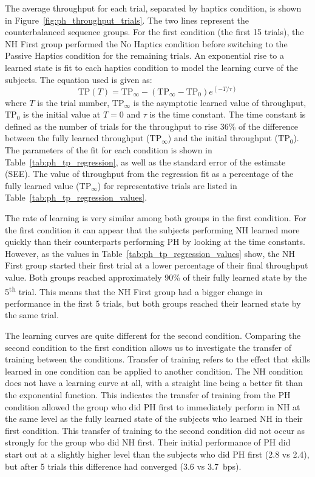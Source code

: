 The average throughput for each trial, separated by haptics condition, is shown in Figure~\ref{fig:ph_throughput_trials}.
The two lines represent the counterbalanced sequence groups.
For the first condition (the first 15 trials), the NH First group performed the No Haptics condition before switching to the Passive Haptics condition for the remaining trials.
An exponential rise to a learned state is fit to each haptics condition to model the learning curve of the subjects.
The equation used is given as:
\begin{equation}
    \mathrm{TP}(T) = \mathrm{TP}_{\infty} - (\mathrm{TP}_{\infty}-\mathrm{TP}_0)e^{\left( -T / \tau \right)}
    \label{eq:ph_learning}
\end{equation}
where $T$ is the trial number, $\mathrm{TP}_{\infty}$ is the asymptotic learned value of throughput, $\mathrm{TP}_0$ is the initial value at $T=0$ and $\tau$ is the time constant.
The time constant is defined as the number of trials for the throughput to rise 36\% of the difference between the fully learned throughput ($\mathrm{TP}_{\infty}$) and the initial throughput ($\mathrm{TP}_0$).
The parameters of the fit for each condition is shown in Table~\ref{tab:ph_tp_regression}, as well as the standard error of the estimate (SEE).
The value of throughput from the regression fit as a percentage of the fully learned value ($\mathrm{TP}_{\infty}$) for representative trials are listed in Table~\ref{tab:ph_tp_regression_values}.

The rate of learning is very similar among both groups in the first condition.
For the first condition it can appear that the subjects performing NH learned more quickly than their counterparts performing PH by looking at the time constants.
However, as the values in Table~\ref{tab:ph_tp_regression_values} show, the NH First group started their first trial at a lower percentage of their final throughput value.
Both groups reached approximately 90\% of their fully learned state by the 5\textsuperscript{th} trial.
This means that the NH First group had a bigger change in performance in the first 5 trials, but both groups reached their learned state by the same trial.

The learning curves are quite different for the second condition.
Comparing the second condition to the first condition allows us to investigate the transfer of training between the conditions.
Transfer of training refers to the effect that skills learned in one condition can be applied to another condition.
The NH condition does not have a learning curve at all, with a straight line being a better fit than the exponential function.
This indicates the transfer of training from the PH condition allowed the group who did PH first to immediately perform in NH at the same level as the fully learned state of the subjects who learned NH in their first condition.
This transfer of training to the second condition did not occur as strongly for the group who did NH first.
Their initial performance of PH did start out at a slightly higher level than the subjects who did PH first (\SI{2.8}{\bps} vs \SI{2.4}{\bps}), but after 5 trials this difference had converged (\SI{3.6}{\bps} vs \SI{3.7}{bps}).

